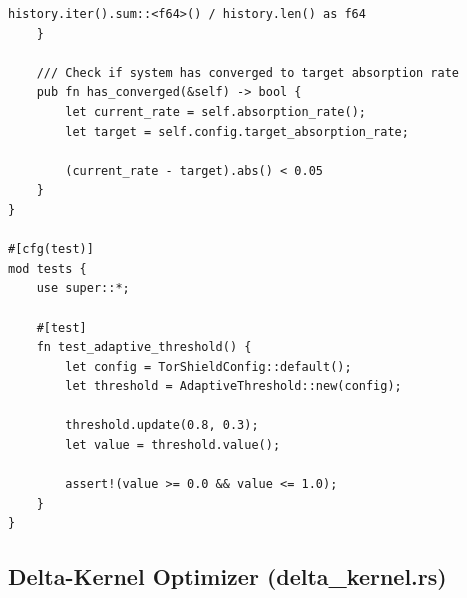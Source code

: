 \documentclass[11pt,a4paper]{article}
\begin{document}
\begin{lstlisting}[style=rust]
        history.iter().sum::<f64>() / history.len() as f64
    }
    
    /// Check if system has converged to target absorption rate
    pub fn has_converged(&self) -> bool {
        let current_rate = self.absorption_rate();
        let target = self.config.target_absorption_rate;
        
        (current_rate - target).abs() < 0.05
    }
}

#[cfg(test)]
mod tests {
    use super::*;
    
    #[test]
    fn test_adaptive_threshold() {
        let config = TorShieldConfig::default();
        let threshold = AdaptiveThreshold::new(config);
        
        threshold.update(0.8, 0.3);
        let value = threshold.value();
        
        assert!(value >= 0.0 && value <= 1.0);
    }
}
\end{lstlisting}

\subsection{Delta-Kernel Optimizer (delta\_kernel.rs)}
\end{document}
